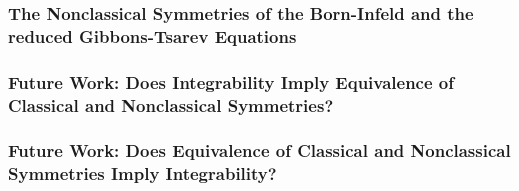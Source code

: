 \documentclass{beamer}
\begin{document}
\begin{frame}
    \frametitle{The Nonclassical Symmetries of the Born-Infeld and the reduced Gibbons-Tsarev Equations}

\end{frame}



\begin{frame}
    \frametitle{Future Work: Does Integrability Imply Equivalence of Classical and Nonclassical Symmetries?}

\end{frame}



\begin{frame}
    \frametitle{Future Work: Does Equivalence of Classical and Nonclassical Symmetries Imply Integrability?}

\end{frame}
\end{document}
